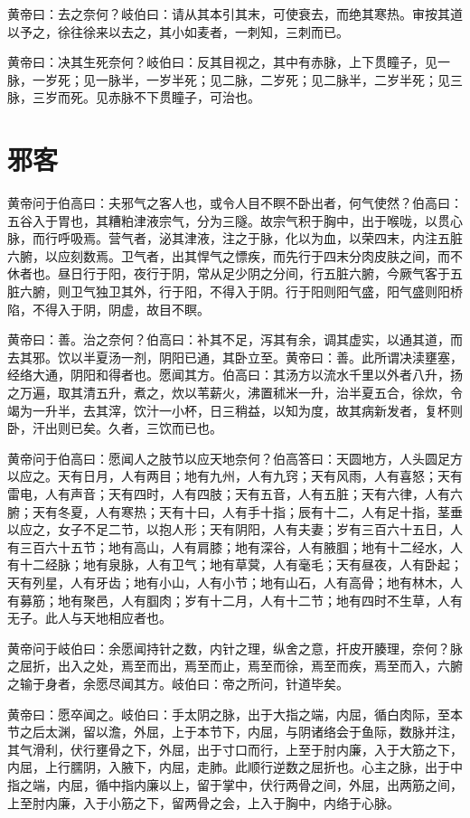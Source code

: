 \documentclass[a4paper,12pt,UTF8,twoside]{ctexbook}
\begin{document}
	黄帝曰：去之奈何？岐伯曰：请从其本引其末，可使衰去，而绝其寒热。审按其道以予之，徐往徐来以去之，其小如麦者，一刺知，三刺而已。
	
	黄帝曰：决其生死奈何？岐伯曰：反其目视之，其中有赤脉，上下贯瞳子，见一脉，一岁死；见一脉半，一岁半死；见二脉，二岁死；见二脉半，二岁半死；见三脉，三岁而死。见赤脉不下贯瞳子，可治也。
	
	\chapter{邪客}
	
	黄帝问于伯高曰：夫邪气之客人也，或令人目不瞑不卧出者，何气使然？伯高曰：五谷入于胃也，其糟粕津液宗气，分为三隧。故宗气积于胸中，出于喉咙，以贯心脉，而行呼吸焉。营气者，泌其津液，注之于脉，化以为血，以荣四末，内注五脏六腑，以应刻数焉。卫气者，出其悍气之慓疾，而先行于四末分肉皮肤之间，而不休者也。昼日行于阳，夜行于阴，常从足少阴之分间，行五脏六腑，今厥气客于五脏六腑，则卫气独卫其外，行于阳，不得入于阴。行于阳则阳气盛，阳气盛则阳桥陷，不得入于阴，阴虚，故目不瞑。
	
	黄帝曰：善。治之奈何？伯高曰：补其不足，泻其有余，调其虚实，以通其道，而去其邪。饮以半夏汤一剂，阴阳已通，其卧立至。黄帝曰：善。此所谓决渎壅塞，经络大通，阴阳和得者也。愿闻其方。伯高曰：其汤方以流水千里以外者八升，扬之万遍，取其清五升，煮之，炊以苇薪火，沸置秫米一升，治半夏五合，徐炊，令竭为一升半，去其滓，饮汁一小杯，日三稍益，以知为度，故其病新发者，复杯则卧，汗出则已矣。久者，三饮而已也。
	
	黄帝问于伯高曰：愿闻人之肢节以应天地奈何？伯高答曰：天圆地方，人头圆足方以应之。天有日月，人有两目；地有九州，人有九窍；天有风雨，人有喜怒；天有雷电，人有声音；天有四时，人有四肢；天有五音，人有五脏；天有六律，人有六腑；天有冬夏，人有寒热；天有十曰，人有手十指；辰有十二，人有足十指，茎垂以应之，女子不足二节，以抱人形；天有阴阳，人有夫妻；岁有三百六十五日，人有三百六十五节；地有高山，人有肩膝；地有深谷，人有腋腘；地有十二经水，人有十二经脉；地有泉脉，人有卫气；地有草蓂，人有毫毛；天有昼夜，人有卧起；天有列星，人有牙齿；地有小山，人有小节；地有山石，人有高骨；地有林木，人有募筋；地有聚邑，人有腘肉；岁有十二月，人有十二节；地有四时不生草，人有无子。此人与天地相应者也。
	
	黄帝问于岐伯曰：余愿闻持针之数，内针之理，纵舍之意，扞皮开腠理，奈何？脉之屈折，出入之处，焉至而出，焉至而止，焉至而徐，焉至而疾，焉至而入，六腑之输于身者，余愿尽闻其方。岐伯曰：帝之所问，针道毕矣。
	
	黄帝曰：愿卒闻之。岐伯曰：手太阴之脉，出于大指之端，内屈，循白肉际，至本节之后太渊，留以澹，外屈，上于本节下，内屈，与阴诸络会于鱼际，数脉并注，其气滑利，伏行壅骨之下，外屈，出于寸口而行，上至于肘内廉，入于大筋之下，内屈，上行臑阴，入腋下，内屈，走肺。此顺行逆数之屈折也。心主之脉，出于中指之端，内屈，循中指内廉以上，留于掌中，伏行两骨之间，外屈，出两筋之间，上至肘内廉，入于小筋之下，留两骨之会，上入于胸中，内络于心脉。
	
\end{document}
